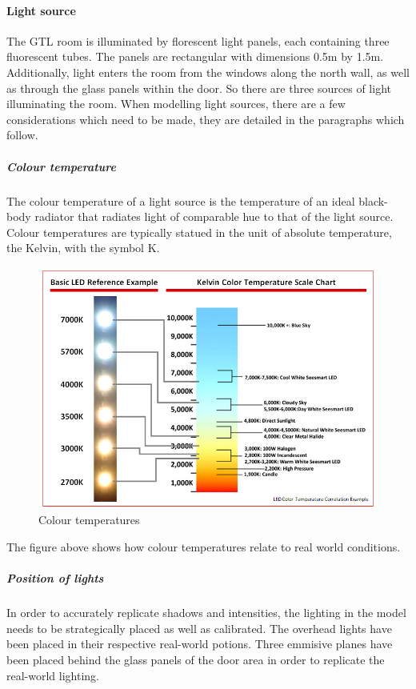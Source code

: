 \documentclass[11pt,a4paper]{report}
\begin{document}
				\paragraph{Light source}
					The GTL room is illuminated by florescent light panels, each containing three fluorescent tubes. The panels are rectangular with dimensions 0.5m by 1.5m. Additionally, light enters the room from the windows along the north wall, as well as through the glass panels within the door. So there are three sources of light illuminating the room. When modelling light sources, there are a few considerations which need to be made, they are detailed in the paragraphs which follow.
					\subparagraph{Colour temperature}
						The colour temperature of a light source is the temperature of an ideal black-body radiator that radiates light of comparable hue to that of the light source. Colour temperatures are typically statued in the unit of absolute temperature, the Kelvin, with the symbol K.
						\begin{figure}[H]
							\centering
							\includegraphics[width=1\textwidth]{colour_temperature}
							\caption{Colour temperatures}
						\end{figure}
						The figure above shows how colour temperatures relate to real world conditions.
				
					\subparagraph{Position of lights}
						In order to accurately replicate shadows and intensities, the lighting in the model needs to be strategically placed as well as calibrated. The overhead lights have been placed in their respective real-world potions. Three emmisive planes have been placed behind the glass panels of the door area in order to replicate the real-world lighting.
						
\end{document}
